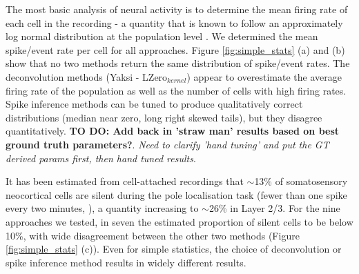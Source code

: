 \documentclass[a4paper,10pt,twocolumn]{article}
\begin{document}
The most basic analysis of neural activity is to determine the mean firing rate of each cell in the recording - a quantity that is known to follow an approximately log normal distribution at the population level \citep{Wohrer2013-rp}. We determined the mean spike/event rate per cell for all approaches. Figure \ref{fig:simple_stats} (a) and (b) show that no two methods return the same distribution of spike/event rates. The deconvolution methods (Yaksi - LZero$_{kernel}$) appear to overestimate the average firing rate of the population as well as the number of cells with high firing rates. Spike inference methods can be tuned to produce qualitatively correct distributions (median near zero, long right skewed tails), but they disagree quantitatively. \textbf{TO DO: Add back in 'straw man' results based on best ground truth parameters?}. \emph{Need to clarify 'hand tuning' and put the GT derived params first, then hand tuned results}.

It has been estimated from cell-attached recordings that $\sim$13\% of somatosensory neocortical cells are silent during the pole localisation task (fewer than one spike every two minutes, \citealt{OConnor2010-hd}), a quantity increasing to $\sim$26\% in Layer 2/3. For the nine approaches we tested, in seven the estimated proportion of silent cells to be below 10\%, with wide disagreement between the other two methods (Figure \ref{fig:simple_stats} (c)). Even for simple statistics, the choice of deconvolution or spike inference method results in widely different results.

\end{document}
